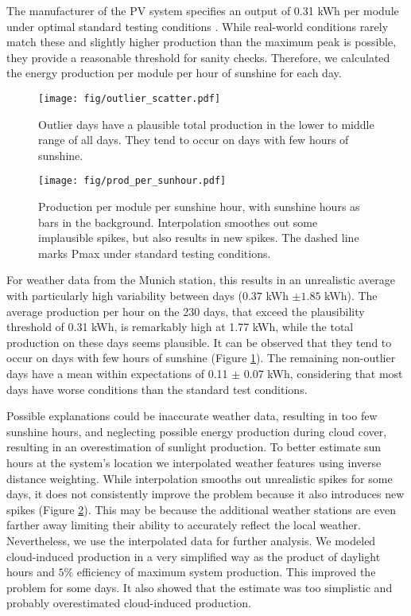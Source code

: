 \documentclass{article}
\begin{document}
The manufacturer of the PV system specifies an output of 0.31 kWh per module under optimal standard testing conditions \citep{MonoSol}. While real-world conditions rarely match these and slightly higher production than the maximum peak is possible, they provide a reasonable threshold for sanity checks. Therefore, we calculated the energy production per module per hour of sunshine for each day.

\begin{figure}[H]
	\texttt{[image: fig/outlier\_scatter.pdf]}
	\caption{Outlier days have a plausible total production in the lower to middle range of all days. They tend to occur on days with few hours of sunshine.}\label{fig:outlier_scatter}
\end{figure}
\begin{figure}[H]
	\texttt{[image: fig/prod\_per\_sunhour.pdf]}
	\caption{Production per module per sunshine hour, with sunshine hours as bars in the background. Interpolation smoothes out some implausible spikes, but also results in new spikes. The dashed line marks Pmax under standard testing conditions.}\label{fig:prod_per_hour}
\end{figure}

For weather data from the Munich station, this results in an unrealistic average with particularly high variability between days ($0.37$ kWh $\pm 1.85$ kWh). The average production per hour on the 230 days, that exceed the plausibility threshold of 0.31 kWh, is remarkably high at 1.77 kWh, while the total production on these days seems plausible. It can be observed that they tend to occur on days with few hours of sunshine (Figure \ref{fig:outlier_scatter}).  The remaining non-outlier days have a mean within expectations of 0.11 $\pm$ 0.07 kWh, considering that most days have worse conditions than the standard test conditions. 

Possible explanations could be inaccurate weather data, resulting in too few sunshine hours, and neglecting possible energy production during cloud cover, resulting in an overestimation of sunlight production. To better estimate sun hours at the system's location we interpolated weather features using inverse distance weighting. While interpolation smooths out unrealistic spikes for some days, it does not consistently improve the problem because it also introduces new spikes (Figure \ref{fig:prod_per_hour}). This may be because the additional weather stations are even farther away limiting their ability to accurately reflect the local weather. Nevertheless, we use the interpolated data for further analysis. We modeled cloud-induced production in a very simplified way as the product of daylight hours and $5\%$ efficiency of maximum system production. This improved the problem for some days. It also showed that the estimate was too simplistic and probably overestimated cloud-induced production.
\end{document}
